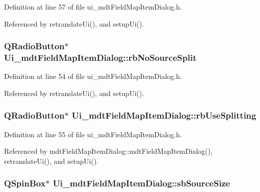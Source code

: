 Definition at line 57 of file ui\-\_\-mdt\-Field\-Map\-Item\-Dialog.\-h.



Referenced by retranslate\-Ui(), and setup\-Ui().

\hypertarget{class_ui__mdt_field_map_item_dialog_abb6702d4d4dc9e75691055e65e0a5a6c}{
\subsubsection[{rb\-No\-Source\-Split}]{\setlength{\rightskip}{0pt plus 5cm}Q\-Radio\-Button$\ast$ Ui\-\_\-mdt\-Field\-Map\-Item\-Dialog\-::rb\-No\-Source\-Split}}\label{class_ui__mdt_field_map_item_dialog_abb6702d4d4dc9e75691055e65e0a5a6c}


Definition at line 54 of file ui\-\_\-mdt\-Field\-Map\-Item\-Dialog.\-h.



Referenced by retranslate\-Ui(), and setup\-Ui().

\hypertarget{class_ui__mdt_field_map_item_dialog_a1714ffa5ad18b098ed6a36dd67c178fb}{
\subsubsection[{rb\-Use\-Splitting}]{\setlength{\rightskip}{0pt plus 5cm}Q\-Radio\-Button$\ast$ Ui\-\_\-mdt\-Field\-Map\-Item\-Dialog\-::rb\-Use\-Splitting}}\label{class_ui__mdt_field_map_item_dialog_a1714ffa5ad18b098ed6a36dd67c178fb}


Definition at line 55 of file ui\-\_\-mdt\-Field\-Map\-Item\-Dialog.\-h.



Referenced by mdt\-Field\-Map\-Item\-Dialog\-::mdt\-Field\-Map\-Item\-Dialog(), retranslate\-Ui(), and setup\-Ui().

\hypertarget{class_ui__mdt_field_map_item_dialog_a26f031167698cd4079a7862b6b6a9cb1}{
\subsubsection[{sb\-Source\-Size}]{\setlength{\rightskip}{0pt plus 5cm}Q\-Spin\-Box$\ast$ Ui\-\_\-mdt\-Field\-Map\-Item\-Dialog\-::sb\-Source\-Size}}\label{class_ui__mdt_field_map_item_dialog_a26f031167698cd4079a7862b6b6a9cb1}


